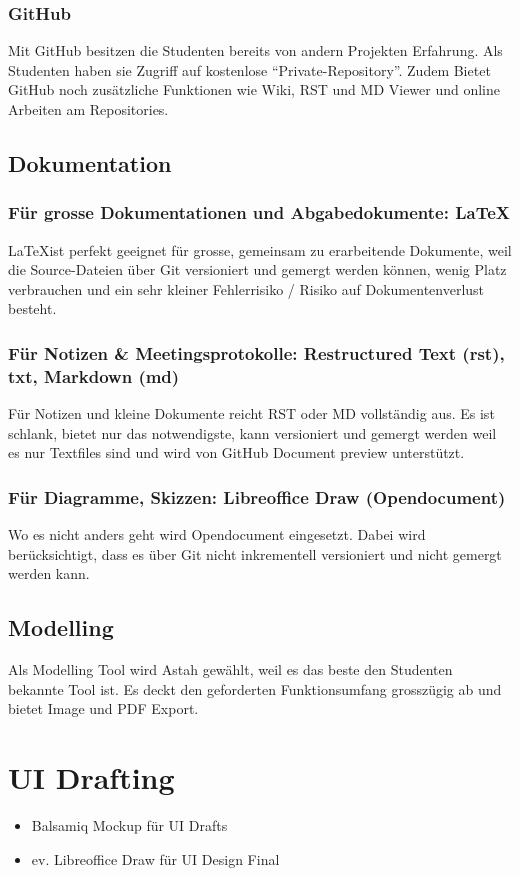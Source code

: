 \subsubsection{GitHub}
Mit GitHub besitzen die Studenten bereits von andern Projekten Erfahrung. Als Studenten haben sie Zugriff auf kostenlose ``Private-Repository''. Zudem Bietet GitHub noch zusätzliche Funktionen wie Wiki, RST und MD Viewer und online Arbeiten am Repositories.


\subsection{Dokumentation}
\subsubsection{Für grosse Dokumentationen und Abgabedokumente: \LaTeX}
\LaTeX ist perfekt geeignet für grosse, gemeinsam zu erarbeitende Dokumente, weil die Source-Dateien über Git versioniert und gemergt werden können, wenig Platz verbrauchen und ein sehr kleiner Fehlerrisiko / Risiko auf Dokumentenverlust besteht.

\subsubsection{Für Notizen \& Meetingsprotokolle: Restructured Text (rst), txt, Markdown (md)}
Für Notizen und kleine Dokumente reicht RST oder MD vollständig aus. Es ist schlank, bietet nur das notwendigste, kann versioniert und gemergt werden weil es nur Textfiles sind und wird von GitHub Document preview unterstützt.

\subsubsection{Für Diagramme, Skizzen: Libreoffice Draw (Opendocument)}
Wo es nicht anders geht wird Opendocument eingesetzt. Dabei wird berücksichtigt, dass es über Git nicht inkrementell versioniert und nicht gemergt werden kann.


\subsection{Modelling}
Als Modelling Tool wird Astah gewählt, weil es das beste den Studenten bekannte Tool ist.
Es deckt den geforderten Funktionsumfang grosszügig ab und bietet Image und PDF Export.

\section{UI Drafting}
\begin{itemize}
	\setlength{\itemsep}{-\parsep}
	\item Balsamiq Mockup für UI Drafts
	\item ev. Libreoffice Draw für UI Design Final
\end{itemize}


